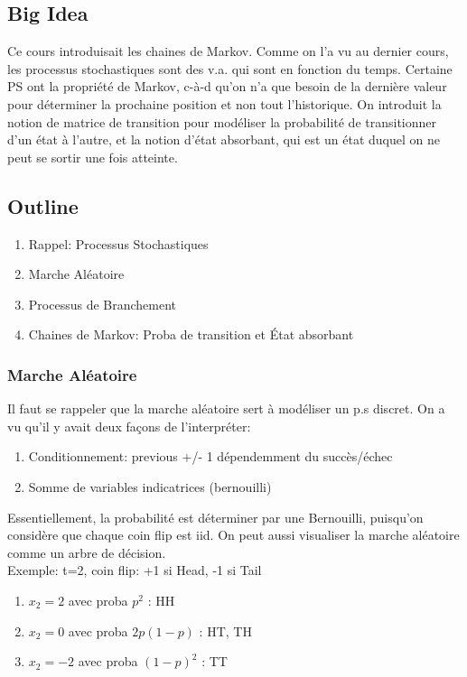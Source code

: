 \documentclass{article}
\begin{document}
\subsection*{Big Idea}

Ce cours introduisait les chaines de Markov. Comme on l'a vu au dernier
cours, les processus stochastiques sont des v.a. qui sont en fonction du
temps. Certaine PS ont la propriété de Markov, c-à-d qu'on n'a que besoin
de la dernière valeur pour déterminer la prochaine position et non tout
l'historique. On introduit la notion de matrice de transition pour modéliser
la probabilité de transitionner d'un état à l'autre, et la notion d'état
absorbant, qui est un état duquel on ne peut se sortir une fois atteinte.

\subsection*{Outline}

\begin{enumerate}
    \item Rappel: Processus Stochastiques
    \item Marche Aléatoire
    \item Processus de Branchement
    \item Chaines de Markov: Proba de transition et État absorbant
\end{enumerate}

\subsubsection{Marche Aléatoire}%
\label{ssub:marche_aléatoire}

Il faut se rappeler que la marche aléatoire sert à modéliser un p.s discret.
On a vu qu'il y avait deux façons de l'interpréter:
\begin{enumerate}
    \item Conditionnement: previous +/- 1 dépendemment du succès/échec
    \item Somme de variables indicatrices (bernouilli)
\end{enumerate}

Essentiellement, la probabilité est déterminer par une Bernouilli, puisqu'on
considère que chaque coin flip est iid. On peut aussi visualiser la
marche aléatoire comme un arbre de décision.\\

Exemple: t=2, coin flip: +1 si Head, -1 si Tail
\begin{enumerate}
    \item $x_2 = 2$ avec proba $p^2$ : {HH}
    \item $x_2 = 0$ avec proba $ 2p (1-p)$ : {HT, TH}
    \item $x_2 = -2$ avec proba $ (1-p)^2$ : {TT}
\end{enumerate}
\end{document}
